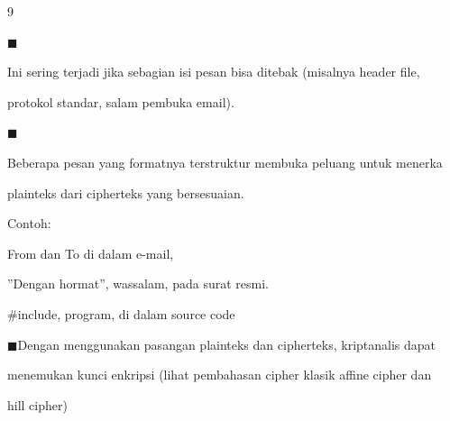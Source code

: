 \documentclass{article}
\begin{document}

9

◼

Ini sering terjadi jika sebagian isi pesan bisa ditebak (misalnya header file, 

protokol standar, salam pembuka email).

◼

Beberapa pesan yang formatnya terstruktur membuka peluang untuk menerka 

plainteks dari cipherteks yang bersesuaian. 

      Contoh: 


From dan To  di dalam e-mail, 

           ”Dengan hormat”, wassalam, pada surat resmi.

            \#include, program, di dalam source code

◼Dengan menggunakan pasangan plainteks dan cipherteks, kriptanalis dapat 

menemukan kunci enkripsi  (lihat pembahasan cipher klasik affine cipher dan 

hill cipher)
\end{document}
